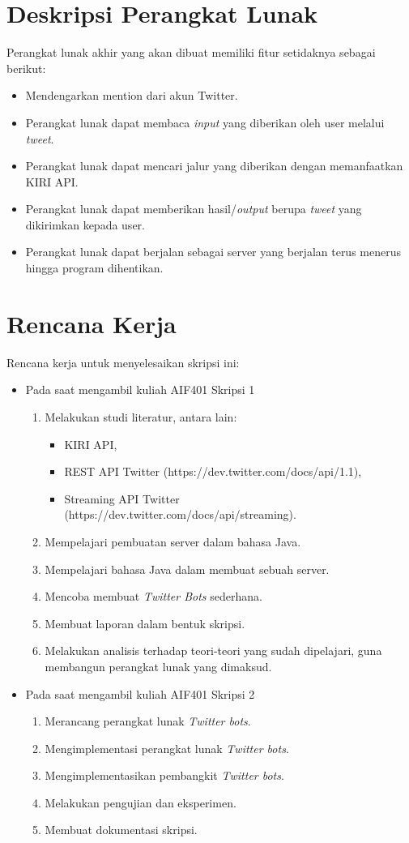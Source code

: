 \section{Deskripsi Perangkat Lunak}
Perangkat lunak akhir yang akan dibuat memiliki fitur setidaknya sebagai berikut:
\begin{itemize}
	\item Mendengarkan mention dari akun Twitter.
	\item Perangkat lunak dapat membaca \textit{input} yang diberikan oleh user melalui \textit{tweet}.
	\item Perangkat lunak dapat mencari jalur yang diberikan dengan memanfaatkan KIRI API.
	\item Perangkat lunak dapat memberikan hasil/\textit{output} berupa \textit{tweet} yang dikirimkan kepada user.
	\item Perangkat lunak dapat berjalan sebagai server yang berjalan terus menerus hingga program dihentikan.
\end{itemize}

\section{Rencana Kerja}
Rencana kerja untuk menyelesaikan skripsi ini:
\begin{itemize}
	\item Pada saat mengambil kuliah AIF401 Skripsi 1
	\begin{enumerate}
		\item Melakukan studi literatur, antara lain:
		\begin{itemize}
			\item KIRI API,
			\item REST API Twitter (https://dev.twitter.com/docs/api/1.1),
			\item Streaming API Twitter (https://dev.twitter.com/docs/api/streaming).
		\end{itemize}
		\item Mempelajari pembuatan server dalam bahasa Java.
		\item Mempelajari bahasa Java dalam membuat sebuah server.
		\item Mencoba membuat \textit{Twitter Bots} sederhana.
		\item Membuat laporan dalam bentuk skripsi.
		\item Melakukan analisis terhadap teori-teori yang sudah dipelajari, guna membangun perangkat lunak yang dimaksud.
	\end{enumerate}
	\item Pada saat mengambil kuliah AIF401 Skripsi 2
	\begin{enumerate}
		\item Merancang perangkat lunak \textit{Twitter bots}.
		\item Mengimplementasi perangkat lunak \textit{Twitter bots}.
		\item Mengimplementasikan pembangkit \textit{Twitter bots}. 
		\item Melakukan pengujian dan eksperimen.
		\item Membuat dokumentasi skripsi.
	\end{enumerate}
\end{itemize}